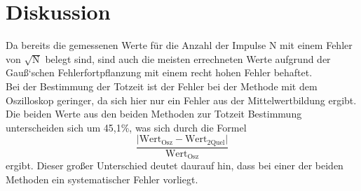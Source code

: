 \section{Diskussion}
\label{sec:Diskussion}
Da bereits die gemessenen Werte für die Anzahl der Impulse N mit einem Fehler
von $\sqrt{\text{N}}$ belegt sind, sind auch die meisten errechneten Werte aufgrund
der Gauß`schen Fehlerfortpflanzung mit einem recht hohen Fehler behaftet. \\
Bei der Bestimmung der Totzeit ist der Fehler bei der Methode mit dem Oszilloskop
geringer, da sich hier nur ein Fehler aus der Mittelwertbildung ergibt.
Die beiden Werte aus den beiden Methoden zur Totzeit Bestimmung unterscheiden sich um 45,1\%,
was sich durch die Formel
\begin{equation*}
  \frac{\lvert \text{Wert}_{\text{Osz}}-\text{Wert}_{\text{2Quel}}\rvert}{\text{Wert}_{\text{Osz}}}
  \label{eqn:abw}
\end{equation*}
ergibt. Dieser großer Unterschied deutet daurauf hin, dass bei einer der beiden Methoden
ein systematischer Fehler vorliegt. 
